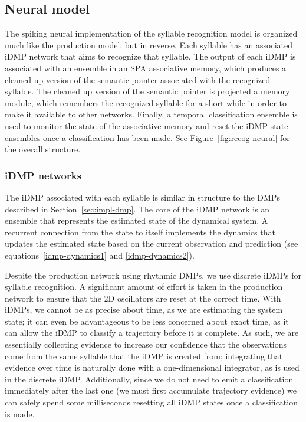 \subsection{Neural model}
\label{sec:impl-recog-neural}


The spiking neural implementation of
the syllable recognition model
is organized much like the production model,
but in reverse.
Each syllable has an associated
iDMP network that aims to recognize
that syllable.
The output of each iDMP is associated
with an ensemble in
an SPA associative memory,
which produces a cleaned up version
of the semantic pointer
associated with the recognized syllable.
The cleaned up version of the semantic pointer
is projected a memory module,
which remembers the recognized syllable
for a short while in order to
make it available to other networks.
Finally, a temporal classification
ensemble is used to monitor the
state of the associative memory
and reset the iDMP state ensembles
once a classification has been made.
See Figure~\ref{fig:recog-neural}
for the overall structure.

\subsubsection{iDMP networks}

The iDMP associated with each syllable
is similar in structure to the DMPs
described in Section~\ref{sec:impl-dmp}.
The core of the iDMP network
is an ensemble that represents
the estimated state of the dynamical system.
A recurrent connection
from the state to itself
implements the dynamics
that updates the estimated state
based on the current observation
and prediction
(see equations~\eqref{idmp-dynamics1}
and \eqref{idmp-dynamics2}).

Despite the production network using rhythmic DMPs,
we use discrete iDMPs for syllable recognition.
A significant amount of effort is taken
in the production network to ensure that
the 2D oscillators are reset at the correct time.
With iDMPs, we cannot be as precise about time,
as we are estimating the system state;
it can even be advantageous
to be less concerned about exact time,
as it can allow the iDMP to classify a trajectory
before it is complete.
As such, we are essentially collecting evidence
to increase our confidence that the
observations come from the same syllable
that the iDMP is created from;
integrating that evidence over time
is naturally done with a one-dimensional integrator,
as is used in the discrete iDMP.
Additionally, since we do not need to emit
a classification immediately after
the last one (we must first accumulate
trajectory evidence)
we can safely spend some milliseconds
resetting all iDMP states
once a classification is made.

